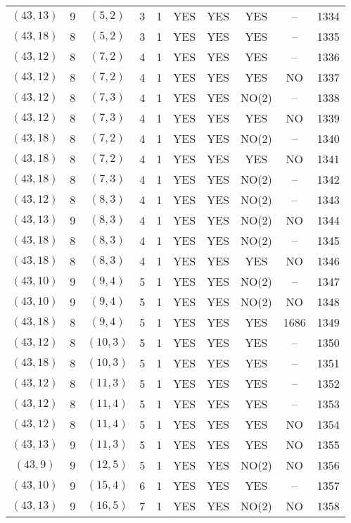 \begin{longtable}{|c|c|c|c|c|c|c|c|c|c|}
$(43, 13)$ & 9 & $(5, 2)$ & 3 & 1 & YES & YES & YES & -- & 1334\\
$(43, 18)$ & 8 & $(5, 2)$ & 3 & 1 & YES & YES & YES & -- & 1335\\
$(43, 12)$ & 8 & $(7, 2)$ & 4 & 1 & YES & YES & YES & -- & 1336\\
$(43, 12)$ & 8 & $(7, 2)$ & 4 & 1 & YES & YES & YES & NO & 1337\\
$(43, 12)$ & 8 & $(7, 3)$ & 4 & 1 & YES & YES & NO(2) & -- & 1338\\
$(43, 12)$ & 8 & $(7, 3)$ & 4 & 1 & YES & YES & YES & NO & 1339\\
$(43, 18)$ & 8 & $(7, 2)$ & 4 & 1 & YES & YES & NO(2) & -- & 1340\\
$(43, 18)$ & 8 & $(7, 2)$ & 4 & 1 & YES & YES & YES & NO & 1341\\
$(43, 18)$ & 8 & $(7, 3)$ & 4 & 1 & YES & YES & NO(2) & -- & 1342\\
$(43, 12)$ & 8 & $(8, 3)$ & 4 & 1 & YES & YES & NO(2) & -- & 1343\\
$(43, 13)$ & 9 & $(8, 3)$ & 4 & 1 & YES & YES & NO(2) & NO & 1344\\
$(43, 18)$ & 8 & $(8, 3)$ & 4 & 1 & YES & YES & NO(2) & -- & 1345\\
$(43, 18)$ & 8 & $(8, 3)$ & 4 & 1 & YES & YES & YES & NO & 1346\\
$(43, 10)$ & 9 & $(9, 4)$ & 5 & 1 & YES & YES & NO(2) & -- & 1347\\
$(43, 10)$ & 9 & $(9, 4)$ & 5 & 1 & YES & YES & NO(2) & NO & 1348\\
$(43, 18)$ & 8 & $(9, 4)$ & 5 & 1 & YES & YES & YES & 1686 & 1349\\
$(43, 12)$ & 8 & $(10, 3)$ & 5 & 1 & YES & YES & YES & -- & 1350\\
$(43, 18)$ & 8 & $(10, 3)$ & 5 & 1 & YES & YES & YES & -- & 1351\\
$(43, 12)$ & 8 & $(11, 3)$ & 5 & 1 & YES & YES & YES & -- & 1352\\
$(43, 12)$ & 8 & $(11, 4)$ & 5 & 1 & YES & YES & YES & -- & 1353\\
$(43, 12)$ & 8 & $(11, 4)$ & 5 & 1 & YES & YES & YES & NO & 1354\\
$(43, 13)$ & 9 & $(11, 3)$ & 5 & 1 & YES & YES & YES & NO & 1355\\
$(43, 9)$ & 9 & $(12, 5)$ & 5 & 1 & YES & YES & NO(2) & NO & 1356\\
$(43, 10)$ & 9 & $(15, 4)$ & 6 & 1 & YES & YES & YES & -- & 1357\\
$(43, 13)$ & 9 & $(16, 5)$ & 7 & 1 & YES & YES & NO(2) & NO & 1358\\

\end{longtable}

